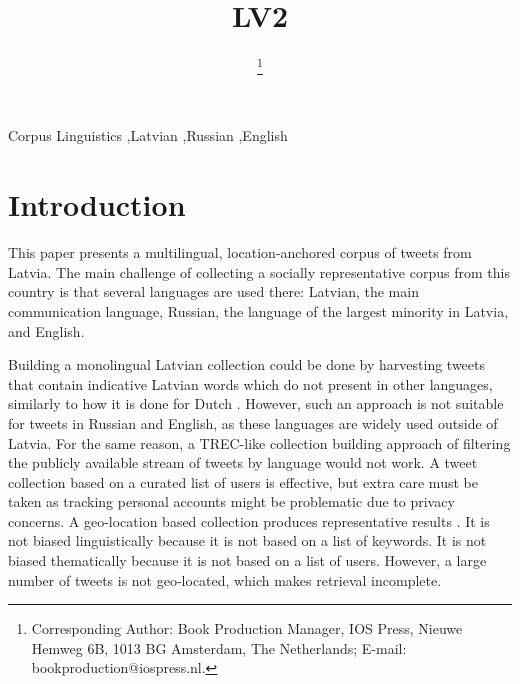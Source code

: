 \documentclass{IOS-Book-Article}
\begin{document}
\begin{frontmatter}              %

\title{LV2}

\author[A]{ %
\thanks{Corresponding Author: Book Production Manager, IOS Press, Nieuwe Hemweg 6B,
1013 BG Amsterdam, The Netherlands; E-mail:
bookproduction@iospress.nl.}}


\address[A]{Confidential Review Copy, Do Not Distribute}

%

\begin{keyword}
Corpus Linguistics \sep Latvian \sep Russian \sep English
\end{keyword}
\end{frontmatter}

\thispagestyle{empty}
\pagestyle{empty}

\section*{Introduction}

This paper presents a multilingual, location-anchored corpus of tweets from Latvia. The main challenge of collecting a socially representative corpus from this country is that several languages are used there: Latvian, the main communication language, Russian, the language of the largest minority in Latvia, and English.

%
Building a monolingual Latvian collection could be done by harvesting tweets that contain indicative Latvian words which do not present in other languages, similarly to how it is done for Dutch \cite{sang2013}. However, such an approach is not suitable for tweets in Russian and English, as these languages are widely used outside of Latvia.
%
For the same reason, a TREC-like collection building approach \cite{lin2016overview} of filtering the publicly available stream of tweets by language would not work.
%
A tweet collection based on a curated list of users \cite{SANVICENTE16.465} is effective, but extra care must be taken as tracking personal accounts might be problematic due to privacy concerns.
%
A geo-location based collection produces representative results \cite{milajevs:2017:BUCC}. It is not biased linguistically because it is not based on a list of keywords. It is not biased thematically because it is not based on a list of users. However, a large number of tweets is not geo-located, which makes retrieval incomplete.
\end{document}
